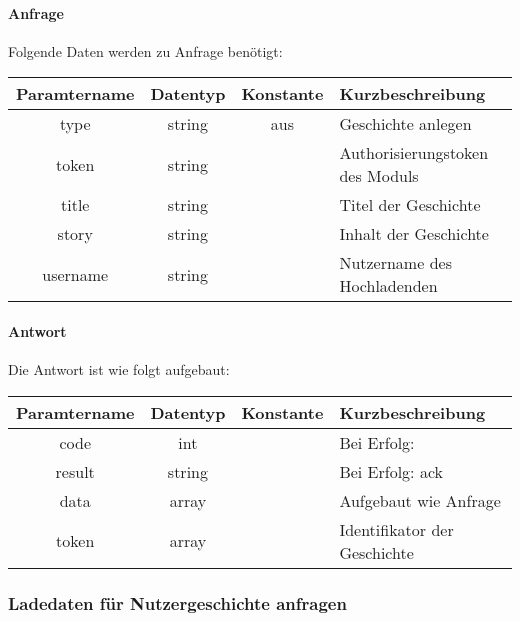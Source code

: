 \paragraph{Anfrage}Folgende Daten werden zu Anfrage benötigt:
\begin{table}[H]
	\begin{tabular}{|c|c|c|p{6.5cm}|}
		\hline
		\textbf{Paramtername} & \textbf{Datentyp} & \textbf{Konstante} & \textbf{Kurzbeschreibung}                                                                                               \\ \hline
		type                & string            & aus                & Geschichte anlegen \\ \hline
		token               & string            &                    & Authorisierungstoken des Moduls \\ \hline
		title               & string            &                    & Titel der Geschichte \\ \hline
		story               & string            &                    & Inhalt der Geschichte \\ \hline
		username            & string            &                    & Nutzername des Hochladenden \\ \hline
	\end{tabular}
\end{table}
\paragraph{Antwort}Die Antwort ist wie folgt aufgebaut:
\begin{table}[H]
	\begin{tabular}{|c|c|c|p{6.5cm}|}
		\hline
		\textbf{Paramtername} & \textbf{Datentyp} & \textbf{Konstante} & \textbf{Kurzbeschreibung}            \\ \hline                
		code                & int              &                 & Bei Erfolg: {\glqq 0\grqq} \\ \hline
		result              & string           &                 & Bei Erfolg: {\glqq ack\grqq} \\ \hline
		data                & array            &                 & Aufgebaut wie Anfrage \\ \hline
		token               & array            &                 & Identifikator der Geschichte \\ \hline
	\end{tabular}
\end{table}
\subsubsection{Ladedaten für Nutzergeschichte anfragen}
